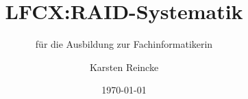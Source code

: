 \documentclass[]{beamer}
\title{LFCX:RAID-Systematik}
\subtitle{für die Ausbildung zur Fachinformatikerin}
\institute{GS-LDK}
\author{Karsten Reincke}
\date{\today}
\def\cfgGl{../../../cfg.gl/}
\begin{document}

\begin{frame}
  \titlepage
\end{frame}






\logo{}
\newpage



%
\end{document}

